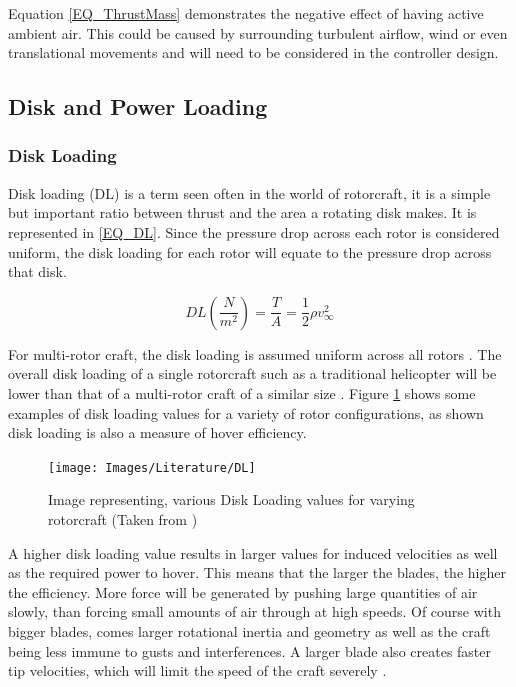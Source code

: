 	Equation \eqref{EQ_ThrustMass} demonstrates the negative effect of having active ambient air. This could be caused by surrounding turbulent airflow, wind or even translational movements and will need to be considered in the controller design.

	\subsection{Disk and Power Loading}
		\subsubsection{Disk Loading}
		Disk loading (DL) is a term seen often in the world of rotorcraft, it is a simple but important ratio between thrust and the area a rotating disk makes. It is represented in \eqref{EQ_DL}. Since the pressure drop across each rotor is considered uniform, the disk loading for each rotor will equate to the pressure drop across that disk.
		 
		\begin{equation}
		\label{EQ_DL}
		DL (\frac{N}{m^{2}})= \frac{T}{A} = \frac{1}{2} \rho v_\infty^2
		\end{equation}
		
		For multi-rotor craft, the disk loading is assumed uniform across all rotors \cite{Leishman}. The overall disk loading of a single rotorcraft such as a traditional helicopter will be lower than that of a multi-rotor craft of a similar size \cite{RotorCraftHand}.  Figure \ref{IM_DL} shows some examples of disk loading values for a variety of rotor configurations, as shown disk loading is also a measure of hover efficiency.

		\begin{figure}[H]
		\centering
		\texttt{[image: Images/Literature/DL]}     
		\caption{Image representing, various Disk Loading values for varying rotorcraft (Taken from \cite{Leishman})}
		\label{IM_DL}
		\end{figure}
		
		A higher disk loading value results in larger values for induced velocities as well as the required power to hover. This means that the larger the blades, the higher the efficiency. More force will be generated by pushing large quantities of air slowly, than forcing small amounts of air through at high speeds. Of course with bigger blades, comes larger rotational inertia and geometry as well as the craft being less immune to gusts and interferences. A larger blade also creates faster tip velocities, which will limit the speed of the craft severely \cite{Leishman}.
		
